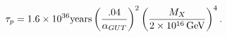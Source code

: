 \begin{equation}\label{plife}
\tau_p=1.6\times 10^{36}{\rm years}\left({.04\over
\alpha_{GUT}}\right)^2\left(M_X\over 2\times 10^{16}\,{\rm
GeV}\right)^4.
\end{equation}

